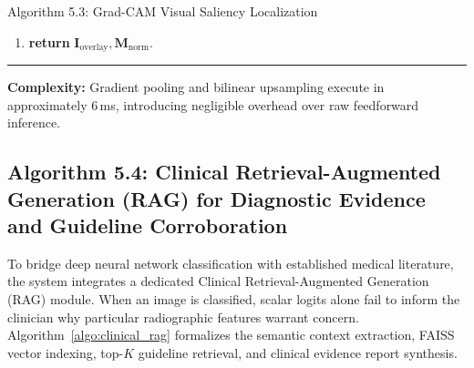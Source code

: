 \documentclass[12pt,a4paper]{report}
\begin{document}
\begin{algoBox}{Algorithm 5.3: Grad-CAM Visual Saliency Localization}
\begin{enumerate}[1:]
    \begin{equation*}
      \mathbf{I}_{\text{overlay}} = \mathrm{round}\Big(\beta \cdot \mathbf{I}_{\text{orig}} + (1 - \beta) \cdot \mathbf{H}_{\text{jet}}\Big) \in [0, 255]^{224 \times 224 \times 3}
    \end{equation*}
  \item \textbf{return} $\mathbf{I}_{\text{overlay}}, \mathbf{M}_{\text{norm}}$.
\end{enumerate}
\noindent\rule{\linewidth}{0.4pt}
\textbf{Complexity:} Gradient pooling and bilinear upsampling execute in approximately 6\,ms, introducing negligible overhead over raw feedforward inference.
\end{algoBox}

\subsection{Algorithm 5.4: Clinical Retrieval-Augmented Generation (RAG) for Diagnostic Evidence and Guideline Corroboration}
To bridge deep neural network classification with established medical literature, the system integrates a dedicated Clinical Retrieval-Augmented Generation (RAG) module. When an image is classified, scalar logits alone fail to inform the clinician why particular radiographic features warrant concern. Algorithm~\ref{algo:clinical_rag} formalizes the semantic context extraction, FAISS vector indexing, top-$K$ guideline retrieval, and clinical evidence report synthesis.
\end{document}
